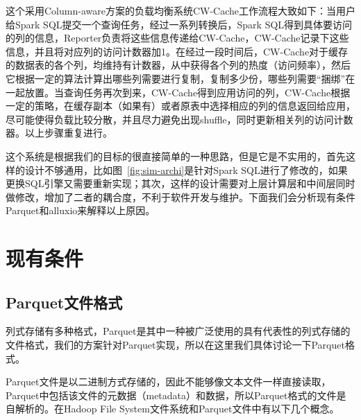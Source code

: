 \par 这个采用Column-aware方案的负载均衡系统CW-Cache工作流程大致如下：当用户给Spark SQL提交一个查询任务，经过一系列转换后，Spark SQL得到具体要访问的列的信息，Reporter负责将这些信息传递给CW-Cache，CW-Cache记录下这些信息，并且将对应列的访问计数器加1。在经过一段时间后，CW-Cache对于缓存的数据表的各个列，均维持有计数器，从中获得各个列的热度（访问频率），然后它根据一定的算法计算出哪些列需要进行复制，复制多少份，哪些列需要“捆绑”在一起放置。当查询任务再次到来，CW-Cache得到应用访问的列，CW-Cache根据一定的策略，在缓存副本（如果有）或者原表中选择相应的列的信息返回给应用，尽可能使得负载比较分散，并且尽力避免出现shuffle，同时更新相关列的访问计数器。以上步骤重复进行。

\par 这个系统是根据我们的目标的很直接简单的一种思路，但是它是不实用的，首先这样的设计不够通用，比如图~\ref{fig:sim-archi}是针对Spark SQL进行了修改的，如果更换SQL引擎又需要重新实现；其次，这样的设计需要对上层计算层和中间层同时做修改，增加了二者的耦合度，不利于软件开发与维护。下面我们会分析现有条件Parquet和alluxio来解释以上原因。

\section{现有条件}

\subsection{Parquet文件格式}

\par 列式存储有多种格式，Parquet是其中一种被广泛使用的具有代表性的列式存储的文件格式，我们的方案针对Parquet实现，所以在这里我们具体讨论一下Parquet格式。

\par Parquet文件是以二进制方式存储的，因此不能够像文本文件一样直接读取，Parquet中包括该文件的元数据（metadata）和数据，所以Parquet格式的文件是自解析的。在Hadoop File System文件系统和Parquet文件中有以下几个概念。

